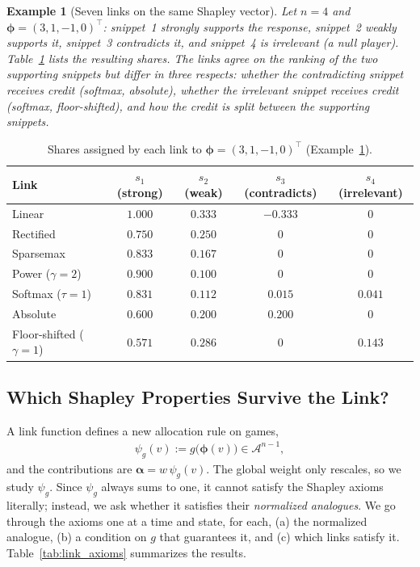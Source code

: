 \documentclass{article}
\newtheorem{example}{Example}
\begin{document}
\begin{example}[Seven links on the same Shapley vector]\label{ex:links}
Let $n = 4$ and $\boldsymbol{\phi} = (3, 1, -1, 0)^\top$: snippet~1 strongly supports the response, snippet~2 weakly supports it, snippet~3 contradicts it, and snippet~4 is irrelevant (a null player). Table~\ref{tab:link_example} lists the resulting shares. The links agree on the ranking of the two supporting snippets but differ in three respects: whether the contradicting snippet receives credit (softmax, absolute), whether the irrelevant snippet receives credit (softmax, floor-shifted), and how the credit is split between the supporting snippets.
\end{example}

\begin{table}[h]
\centering
\small
\begin{tabular}{lcccc}
\hline
\textbf{Link} & $s_1$ (strong) & $s_2$ (weak) & $s_3$ (contradicts) & $s_4$ (irrelevant) \\ \hline
Linear                       & $1.000$ & $0.333$ & $-0.333$ & $0$ \\
Rectified                    & $0.750$ & $0.250$ & $0$      & $0$ \\
Sparsemax                    & $0.833$ & $0.167$ & $0$      & $0$ \\
Power ($\gamma = 2$)         & $0.900$ & $0.100$ & $0$      & $0$ \\
Softmax ($\tau = 1$)         & $0.831$ & $0.112$ & $0.015$  & $0.041$ \\
Absolute                     & $0.600$ & $0.200$ & $0.200$  & $0$ \\
Floor-shifted ($\gamma = 1$) & $0.571$ & $0.286$ & $0$      & $0.143$ \\ \hline
\end{tabular}
\caption{Shares assigned by each link to $\boldsymbol{\phi} = (3, 1, -1, 0)^\top$ (Example~\ref{ex:links}).}
\label{tab:link_example}
\end{table}

\subsection{Which Shapley Properties Survive the Link?}
\label{subsec:link_axioms}

A link function defines a new allocation rule on games,
\begin{align}
    \psi_g(v) := g\big(\boldsymbol{\phi}(v)\big) \in \mathcal{A}^{n-1},
\end{align}
and the contributions are $\boldsymbol{\alpha} = w\, \psi_g(v)$. The global weight only rescales, so we study $\psi_g$. Since $\psi_g$ always sums to one, it cannot satisfy the Shapley axioms literally; instead, we ask whether it satisfies their \emph{normalized analogues}. We go through the axioms one at a time and state, for each, (a) the normalized analogue, (b) a condition on $g$ that guarantees it, and (c) which links satisfy it. Table~\ref{tab:link_axioms} summarizes the results.
\end{document}

